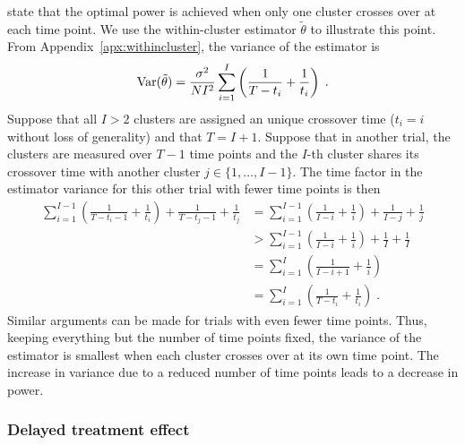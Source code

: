 \documentclass[10pt]{article}
\begin{document}
\textcite{Hussey:2007} state that the optimal power is achieved when only one cluster crosses over at each time point. We use the within-cluster estimator $\tilde{\theta}$ to illustrate this point. From Appendix~\ref{apx:withincluster}, the variance of the estimator is
\[
\mathrm{Var}(\tilde{\theta}) = \frac{\sigma^2}{NI^2}\sum_{i=1}^I\left(\frac{1}{T-t_i} + \frac{1}{t_i}\right) \;.
\]
Suppose that all $I>2$ clusters are assigned an unique crossover time ($t_i=i$ without loss of generality) and that $T=I+1$. Suppose that in another trial, the clusters are measured over $T-1$ time points and the $I$-th cluster shares its crossover time with another cluster $j\in\{1,\ldots,I-1\}$. The time factor in the estimator variance for this other trial with fewer time points is then
\begin{align*}
\sum_{i=1}^{I-1}\left(\frac{1}{T-t_i-1} + \frac{1}{t_i}\right) + \frac{1}{T-t_j-1} + \frac{1}{t_j} &= \sum_{i=1}^{I-1}\left(\frac{1}{I-i} + \frac{1}{i}\right) + \frac{1}{I-j} + \frac{1}{j} \\
&> \sum_{i=1}^{I-1}\left(\frac{1}{I-i} + \frac{1}{i}\right) + \frac{1}{I} + \frac{1}{I} \\
&= \sum_{i=1}^I\left(\frac{1}{I-i+1}+\frac{1}{i}\right) \\
&= \sum_{i=1}^I\left(\frac{1}{T-t_i}+\frac{1}{t_i}\right) \;.
\end{align*}
Similar arguments can be made for trials with even fewer time points. Thus, keeping everything but the number of time points fixed, the variance of the estimator is smallest when each cluster crosses over at its own time point. The increase in variance due to a reduced number of time points leads to a decrease in power.

\subsubsection{Delayed treatment effect} \label{apx:delay}
\end{document}
